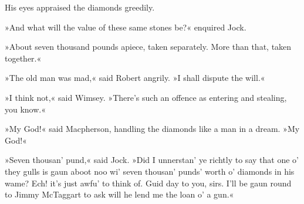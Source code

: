 His eyes appraised the diamonds greedily.

»And what will the value of these same stones be?« enquired Jock.

»About seven thousand pounds apiece, taken separately. More than that, taken together.«

»The old man was mad,« said Robert angrily. »I shall dispute the will.«

»I think not,« said Wimsey. »There's such an offence as entering and stealing, you know.«

»My God!« said Macpherson, handling the diamonds like a man in a dream. »My God!«

»Seven thousan' pund,« said Jock. »Did I unnerstan' ye richtly to say that one o' they gulls is gaun aboot noo wi' seven thousan' punds' worth o' diamonds in his wame? Ech! it's just awfu' to think of. Guid day to you, sirs. I'll be gaun round to Jimmy McTaggart to ask will he lend me the loan o' a gun.«

